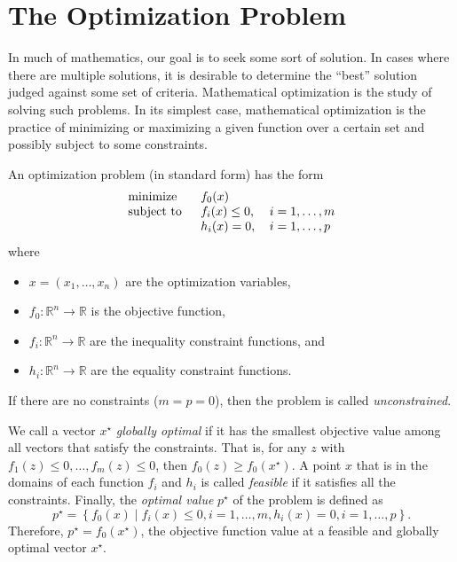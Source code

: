 \section{The Optimization Problem}

In much of mathematics, our goal is to seek some sort of solution. In cases where there are multiple solutions, it is desirable to determine the ``best'' solution judged against some set of criteria. Mathematical optimization is the study of solving such problems. In its simplest case, mathematical optimization is the practice of minimizing or maximizing a given function over a certain set and possibly subject to some constraints.

\begin{defn}
An optimization problem (in standard form) has the form
\begin{equation}
	\begin{tabular}{lll}
		\text{minimize }   & $f_0(x)$          & \\
		\text{subject to } & $f_i(x)\leq 0$, & $i=1,\ldots, m$\\
		& $h_i(x) = 0$,      & $i=1,\ldots, p$
	\end{tabular}\label{Optimization}
\end{equation}
where
\begin{itemize}
	\item $x=\left(x_1,\ldots,x_n\right)$ are the optimization variables,
	\item $f_0 : \mathbb{R}^n\rightarrow\mathbb{R}$ is the objective function,
	\item $f_i : \mathbb{R}^n\rightarrow\mathbb{R}$ are the inequality constraint functions, and
	\item $h_i : \mathbb{R}^n\rightarrow\mathbb{R}$ are the equality constraint functions.
\end{itemize}
\end{defn}
If there are no constraints ($m=p=0$), then the problem is called \textit{unconstrained}. \cite[p. 127]{Boyd2004}

We call a vector $x^\star$ \textit{globally optimal} if it has the smallest objective value among all vectors that satisfy the constraints. That is, for any $z$ with $f_1(z)\leq 0,\ldots, f_m(z)\leq 0$, then $f_0(z)\geq f_0(x^\star)$. A point $x$ that is in the domains of each function $f_i$ and $h_i$ is called \textit{feasible} if it satisfies all the constraints. Finally, the \textit{optimal value} $p^\star$ of the problem is defined as $$p^\star=\left\lbrace f_0(x) \mid f_i(x)\leq 0, i=1,\ldots,m, h_i(x)=0, i=1,\ldots,p\right\rbrace.$$ Therefore, $p^{\star}=f_0(x^\star)$, the objective function value at a feasible and globally optimal vector $x^{\star}$.

